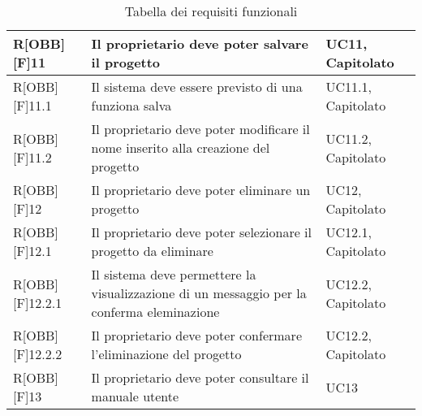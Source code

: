 	\begin{table}[h]
		\begin{tabular}{|p{}|p{}|p{}|}
			\midrule
	
			R[OBB][F]11 & Il proprietario deve poter salvare il progetto & UC11, Capitolato  \\ \midrule
			R[OBB][F]11.1 & Il sistema deve essere previsto di una funziona salva & UC11.1, Capitolato \\ \midrule
			R[OBB][F]11.2 & Il proprietario deve poter modificare il nome inserito alla creazione del progetto & UC11.2, Capitolato \\ \midrule
			R[OBB][F]12 & Il proprietario deve poter eliminare un progetto & UC12, Capitolato \\ \midrule
			R[OBB][F]12.1 & Il proprietario deve poter selezionare il progetto da eliminare & UC12.1, Capitolato \\ \midrule
			R[OBB][F]12.2.1 & Il sistema deve permettere la visualizzazione di un messaggio per la conferma eleminazione & UC12.2, Capitolato \\ \midrule
			R[OBB][F]12.2.2 & Il proprietario deve poter confermare l'eliminazione del progetto  & UC12.2, Capitolato \\ \midrule
			R[OBB][F]13 & Il proprietario deve poter consultare il manuale utente & UC13 \\
	
			\bottomrule
	
		\end{tabular}
		\caption{Tabella dei requisiti funzionali}
	\end{table}
	\newpage